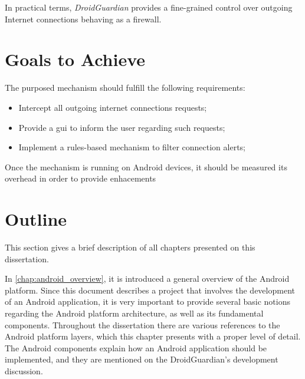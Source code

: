 In practical terms, \textit{DroidGuardian} provides a fine-grained control over outgoing Internet connections behaving as a firewall.



\section{Goals to Achieve}
\label{sec:goals}

The purposed mechanism should fulfill the following requirements:

\begin{itemize}
\item Intercept all outgoing internet connections requests;
\item Provide a \gls{gui} to inform the user regarding such requests;
\item Implement a rules-based mechanism to filter connection alerts;
\end{itemize}

Once the mechanism is running on Android devices, it should be measured its overhead in order to provide enhacements

\section{Outline}
\label{sec:outline}

This section gives a brief description of all chapters presented on this dissertation.

In \autoref{chap:android_overview}, it is introduced a general overview of the Android platform. Since this document describes a project that involves the development of an Android application, it is very important to provide several basic notions regarding the Android platform architecture, as well as its fundamental components. Throughout the dissertation there are various references to the Android platform layers, which this chapter presents with a proper level of detail. The Android components explain how an Android application should be implemented, and they are mentioned on the DroidGuardian's development discussion.

